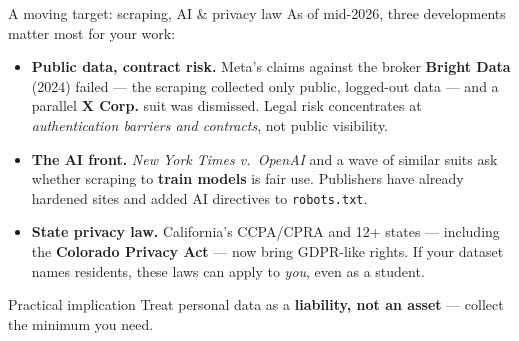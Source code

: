 \documentclass[9pt,aspectratio=169]{beamer}
\begin{document}
\begin{frame}{A moving target: scraping, AI \& privacy law}
    As of mid-2026, three developments matter most for your work:
    \begin{itemize}
        \item \textbf{Public data, contract risk.} Meta's claims against the broker \textbf{Bright Data} (2024) failed --- the scraping collected only public, logged-out data --- and a parallel \textbf{X Corp.} suit was dismissed. Legal risk concentrates at \textit{authentication barriers and contracts}, not public visibility.
        \item \textbf{The AI front.} \textit{New York Times v.\ OpenAI} and a wave of similar suits ask whether scraping to \textbf{train models} is fair use. Publishers have already hardened sites and added AI directives to \texttt{robots.txt}.
        \item \textbf{State privacy law.} California's CCPA/CPRA and 12+ states --- including the \textbf{Colorado Privacy Act} --- now bring GDPR-like rights. If your dataset names residents, these laws can apply to \textit{you}, even as a student.
    \end{itemize}
    \vspace{0.3em}
    \begin{alertblock}{Practical implication}
        \footnotesize Treat personal data as a \textbf{liability, not an asset} --- collect the minimum you need.
    \end{alertblock}
\end{frame}
\end{document}
